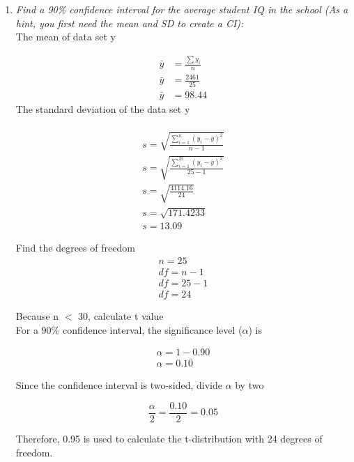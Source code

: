\documentclass[12pt,letterpaper]{article}
\begin{document}
\begin{enumerate}
	\item {\textit{Find a 90\% confidence interval for the average student IQ in the school (As a hint, you first need the mean and SD to create a CI):}}\\
	
	The mean of data set y\\
	\vspace{1cm}
	
	
	\[
	\begin{aligned}
		\bar{y} &= \frac{\sum y_i}{n} \\
		\bar{y} &= \frac{2461}{25} \\
		\bar{y} &= 98.44
	\end{aligned}
	\]
	The standard deviation of the data set y\\
	\vspace{1cm}
	\	
	\[
	\begin{aligned}
	s = \sqrt{\frac{\sum_{i=1}^{n}(y_i-\bar{y})^2}{n-1}}\\
	s = \sqrt{\frac{\sum_{i=1}^{25}(y_i-\bar{y})^2}{25-1}}\\
	s = \sqrt{\frac{4114.16}{24}}\\
	s = \sqrt{171.4233}\\
	s = 13.09
	\end{aligned}
	\]
	
	Find the degrees of freedom
	\[
	\begin{aligned}
	n=25\\
	df=n-1\\
	df=25-1\\
	df=24
	\end{aligned}
	\]	


	Because n $<$ 30, calculate t value\\
	
	For a 90\% confidence interval, the significance level ($\alpha$) is
	
	\[
	\begin{aligned}
	\alpha = 1-0.90 \\
	\alpha = 0.10
	\end{aligned}
	\]
	
	Since the confidence interval is two-sided, divide $\alpha$ by two
	
	\[
	\frac{\alpha}{2} = \frac{0.10}{2}=0.05
	\]
	
	Therefore, 0.95 is used to calculate the t-distribution
	with 24 degrees of freedom.
	


\end{enumerate}
\end{document}
